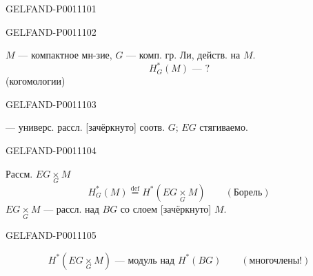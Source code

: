 \begin{GelfandAdjacentEvidence}{GELFAND-P001110}{1}
\end{GelfandAdjacentEvidence}
\begin{GelfandAdjacentEvidence}{GELFAND-P001110}{2}

$M$ — компактное мн-зие, $G$ — комп. гр. Ли, действ. на $M$.
\[
H_G^*(M)\text{ — ?}
\]
(когомологии)

\end{GelfandAdjacentEvidence}
\begin{GelfandAdjacentEvidence}{GELFAND-P001110}{3}

— универс. рассл. [зачёркнуто] соотв. $G$; $EG$ стягиваемо.
\end{GelfandAdjacentEvidence}
\begin{GelfandAdjacentEvidence}{GELFAND-P001110}{4}


Рассм. $EG\underset G\times M$
\[
H_G^*(M)\overset{\mathrm{def}}=H^*(EG\underset G\times M)
\qquad(\text{Борель})
\]
$EG\underset G\times M$ — рассл. над $BG$ со слоем [зачёркнуто] $M$.
\end{GelfandAdjacentEvidence}
\begin{GelfandAdjacentEvidence}{GELFAND-P001110}{5}


\[
H^*(EG\underset G\times M)\text{ — модуль над }
H^*(BG)\qquad(\text{многочлены!})
\]
\end{GelfandAdjacentEvidence}
